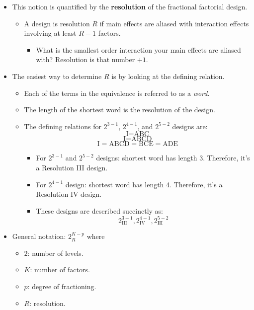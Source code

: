 \begin{itemize}
    \item This notion is quantified by the \textbf{resolution} of the fractional factorial design.
          \begin{itemize}[$\rightarrow$]
              \item A design is resolution $R$ if main effects are aliased with interaction effects involving at least $R - 1$ factors.
                    \begin{itemize}[label={}]
                        \item What is the smallest order interaction your main effects are aliased with? Resolution is that number $ +1 $.
                    \end{itemize}
          \end{itemize}
    \item The easiest way to determine $R$ is by looking at the defining relation.
          \begin{itemize}
              \item Each of the terms in the equivalence is referred to as a \emph{word}.
          \end{itemize}
          \begin{itemize}[$\rightarrow$]
              \item The length of the shortest word is the resolution of the design.
          \end{itemize}
          \begin{itemize}[*]
              \item The defining relations for $ 2^{3-1} $, $ 2^{4-1} $, and $ 2^{5-2} $ designs are:
                    \[ \text{I}=\text{ABC} \]
                    \[ \text{I}=\text{ABCD} \]
                    \[ \text{I}=\text{ABCD}=\text{BCE}=\text{ADE} \]
                    \begin{itemize}[label={}]
                        \item For $ 2^{3-1} $ and $ 2^{5-2} $ designs: shortest word has length 3. Therefore, it's a Resolution III design.
                        \item For $ 2^{4-1} $ design: shortest word has length 4. Therefore, it's a Resolution IV design.
                        \item These designs are described succinctly as:
                              \[ 2^{3-1}_{\text{III}},2^{4-1}_{\text{IV}},2^{5-2}_{\text{III}} \]
                    \end{itemize}
          \end{itemize}
    \item General notation: $ 2_R^{K-p} $ where
          \begin{itemize}
              \item $ 2 $: number of levels.
              \item $ K $: number of factors.
              \item $ p $: degree of fractioning.
              \item $ R $: resolution.
          \end{itemize}
\end{itemize}
